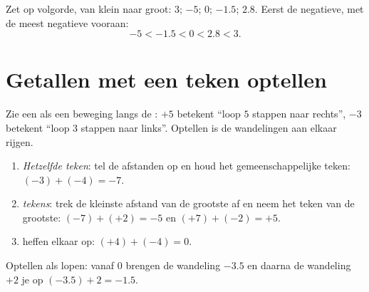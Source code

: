 \begin{example}\label{ex:g7:negatives:compare}
Zet op volgorde, van klein naar groot: $3$; $-5$; $0$; $-1.5$; $2.8$. Eerst de
negatieve, met de meest negatieve vooraan:
\[
-5 < -1.5 < 0 < 2.8 < 3 .
\]
\end{example}

\section{Getallen met een teken optellen}

Zie een  als een beweging langs de : $+5$ betekent ``loop
$5$ stappen naar rechts'', $-3$ betekent ``loop $3$ stappen naar links''.
Optellen is de wandelingen aan elkaar rijgen.

\begin{method}\label{met:g7:negatives:add}
\begin{enumerate}
  \item \emph{Hetzelfde teken}: tel de afstanden op en houd het gemeenschappelijke
        teken: $(-3) + (-4) = -7$.
  \item \emph{ tekens}: trek de kleinste afstand van de grootste af
        en neem het teken van de grootste: $(-7) + (+2) = -5$ en
        $(+7) + (-2) = +5$.
  \item {} heffen elkaar op: $(+4) + (-4) = 0$.
\end{enumerate}
\end{method}

\begin{omfigure}

{\small Optellen als lopen: vanaf $0$ brengen de wandeling $-3.5$ en daarna de
wandeling $+2$ je op $(-3.5) + 2 = -1.5$.}
\end{omfigure}

